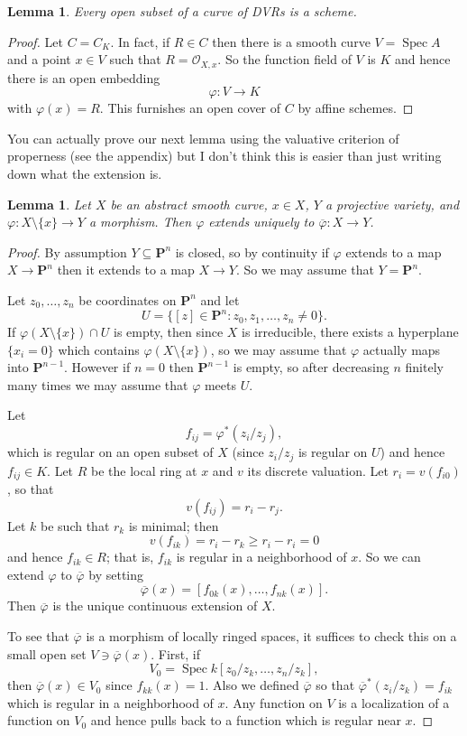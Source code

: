 \documentclass[reqno,12pt,letterpaper]{amsart}
\newcommand{\PP}{\mathbf P}
\DeclareMathOperator{\Spec}{Spec}
\newcommand{\Olo}{\mathscr O}
\newtheorem{lemma}[theorem]{Lemma}
\theoremstyle{definition}
\begin{document}
\begin{lemma}
Every open subset of a curve of DVRs is a scheme.
\end{lemma}
\begin{proof}
Let $C = C_K$.
In fact, if $R \in C$ then there is a smooth curve $V = \Spec A$ and a point $x \in V$ such that $R = \Olo_{X,x}$.
So the function field of $V$ is $K$ and hence there is an open embedding
$$\varphi: V \to K$$
with $\varphi(x) = R$. This furnishes an open cover of $C$ by affine schemes.
\end{proof}

You can actually prove our next lemma using the valuative criterion of properness (see the appendix) but I don't think this is easier than just writing down what the extension is.

\begin{lemma}
Let $X$ be an abstract smooth curve, $x \in X$, $Y$ a projective variety, and $\varphi: X \setminus \{x\} \to Y$ a morphism.
Then $\varphi$ extends uniquely to $\overline \varphi: X \to Y$.
\end{lemma}
\begin{proof}
By assumption $Y \subseteq \PP^n$ is closed, so by continuity if $\varphi$ extends to a map $X \to \PP^n$ then it extends to a map $X \to Y$.
So we may assume that $Y = \PP^n$.

Let $z_0, \dots, z_n$ be coordinates on $\PP^n$ and let
$$U = \{[z] \in \PP^n: z_0, z_1, \dots, z_n \neq 0\}.$$
If $\varphi(X \setminus \{x\}) \cap U$ is empty, then since $X$ is irreducible, there exists a hyperplane $\{x_i = 0\}$ which contains $\varphi(X \setminus \{x\})$, so we may assume that $\varphi$ actually maps into $\PP^{n - 1}$.
However if $n = 0$ then $\PP^{n - 1}$ is empty, so after decreasing $n$ finitely many times we may assume that $\varphi$ meets $U$.

Let
$$f_{ij} = \varphi^*(z_i/z_j),$$
which is regular on an open subset of $X$ (since $z_i/z_j$ is regular on $U$) and hence $f_{ij} \in K$.
Let $R$ be the local ring at $x$ and $v$ its discrete valuation.
Let $r_i = v(f_{i0})$, so that
$$v(f_{ij}) = r_i - r_j.$$
Let $k$ be such that $r_k$ is minimal; then
$$v(f_{ik}) = r_i - r_k \geq r_i - r_i = 0$$
and hence $f_{ik} \in R$; that is, $f_{ik}$ is regular in a neighborhood of $x$.
So we can extend $\varphi$ to $\overline \varphi$ by setting
$$\overline \varphi(x) = [f_{0k}(x), \dots, f_{nk}(x)].$$
Then $\overline \varphi$ is the unique continuous extension of $X$.

To see that $\overline \varphi$ is a morphism of locally ringed spaces, it suffices to check this on a small open set $V \ni \overline \varphi(x)$.
First, if
$$V_0 = \Spec k[z_0/z_k, \dots, z_n/z_k],$$
then $\overline \varphi(x) \in V_0$ since $f_{kk}(x) = 1$.
Also we defined $\overline \varphi$ so that $\overline \varphi^*(z_i/z_k) = f_{ik}$ which is regular in a neighborhood of $x$.
Any function on $V$ is a localization of a function on $V_0$ and hence pulls back to a function which is regular near $x$.
\end{proof}
\end{document}
